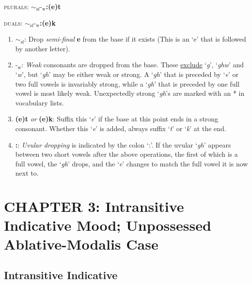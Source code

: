 \documentclass{article}
\begin{document}
\textsc{plurals}: \textbf{${\sim}_\text{sf}\text{-}_\text{w}$:(e)t}

\noindent \textsc{duals}: \textbf{${\sim}_\text{sf}\text{-}_\text{w}$:(e)k}

\begin{enumerate}
\item \textbf{${\sim}_\text{sf}$}: Drop \textit{semi-final} \textbf{e} from the base if it exists (This is an `e' that is followed by another letter).
\item \textbf{$\text{-}_\text{w}$}: \textit{Weak} consonants are dropped from the base. These \underline{exclude} `\textit{g}', `\textit{ghw}' and `\textit{w}', but `\textit{gh}' may be either weak or strong. A `\textit{gh}' that is preceded by `\textit{e}' or two full vowels is invariably strong, while a `\textit{gh}' that is preceded by one full vowel is most likely weak. Unexpectedly strong `\textit{gh}'s are marked with an * in vocabulary lists.
\item \textbf{(e)t} \textit{or} \textbf{(e)k}: Suffix this `\textit{e}' if the base at this point ends in a strong consonant. Whether this `\textit{e}' is added, always suffix `\textit{t}' or `\textit{k}' at the end.
\item \textbf{:}: \textit{Uvular dropping} is indicated by the colon `:'. If the uvular `\textit{gh}' appears between two short vowels after the above operations, the first of which is a full vowel, the `\textit{gh}' drops, and the `\textit{e}' changes to match the full vowel it is now next to.
\end{enumerate}

\section{CHAPTER 3: Intransitive Indicative Mood; Unpossessed Ablative-Modalis Case}

\subsection{Intransitive Indicative}
\end{document}
